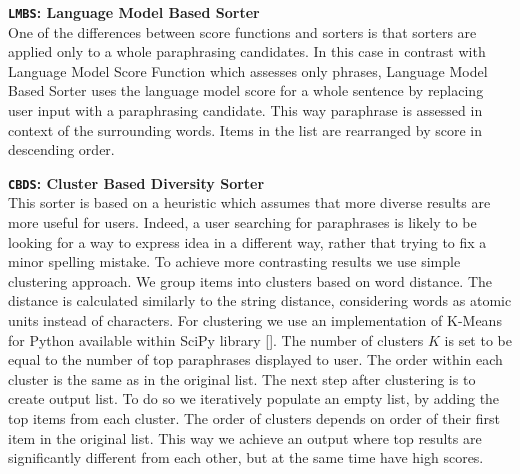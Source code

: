 \begin{flushleft}

\textbf{\texttt{LMBS}: \textbf{Language Model Based Sorter}} \\
One of the differences between score functions and sorters is that sorters are applied only to a whole paraphrasing candidates. In this case in contrast with Language Model Score Function which assesses only phrases, Language Model Based Sorter uses the language model score for a whole sentence by replacing user input with a paraphrasing candidate. This way paraphrase is assessed in context of the surrounding words. Items in the list are rearranged by score in descending order. 
\bigskip

\textbf{\texttt{CBDS}: \textbf{Cluster Based Diversity Sorter}} \\
This sorter is based on a heuristic which assumes that more diverse results are more useful for users. Indeed, a user searching for paraphrases is likely to be looking for a way to express idea in a different way, rather that trying to fix a minor spelling mistake. To achieve more contrasting results we use simple clustering approach. We group items into clusters based on word distance. The distance is calculated similarly to the string distance, considering words as atomic units instead of characters. For clustering we use an implementation of K-Means for Python available within SciPy library []. The number of clusters $K$ is set to be equal to the number of top paraphrases displayed to user. The order within each cluster is the same as in the original list. The next step after clustering is to create output list. To do so we iteratively populate an empty list, by adding the top items from each cluster. The order of clusters depends on order of their first item in the original list. This way we achieve an output where top results are significantly different from each other, but at the same time have high scores.
\bigskip

\end{flushleft}


